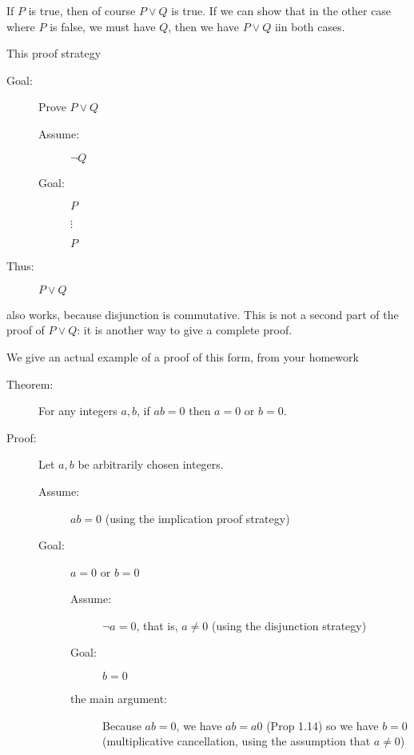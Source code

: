 \documentclass[12pt]{article}
\begin{document}
If $P$ is true, then of course $P \vee Q$ is true.  If we can show that in the other case where $P$ is false, we must have $Q$, then we have $P \vee Q$ iin both cases.

\newpage

This proof strategy

\begin{description}

\item[Goal:]  Prove $P \vee Q$

\begin{description}
\item[Assume:] $\neg Q$

\item[Goal:] $P$

$\vdots$

$P$


\end{description}

\item[Thus:]  $P \vee Q$

\end{description}

also works, because disjunction is commutative.  This is not a second part of the proof of $P \vee Q$:  it is another way to give a complete proof.

We give an actual example of a proof of this form, from your homework

\begin{description}

\item[Theorem:]  For any integers $a,b$, if $ab=0$ then $a=0$ or $b=0$.

\item[Proof:]

Let $a,b$ be arbitrarily chosen integers.

\begin{description}

\item[Assume:]  $ab=0$ (using the implication proof strategy)

\item[Goal:]  $a=0$ or $b=0$

\begin{description}

\item[Assume:]  $\neg a=0$, that is, $a \neq 0$ (using the disjunction strategy)

\item[Goal:]  $b=0$

\item[the main argument:]  Because $ab=0$, we have $ab = a0$ (Prop 1.14) so we have $b=0$ (multiplicative cancellation, using the assumption that $a \neq 0$)

\end{description}


\end{description}


\end{description}
\end{document}

